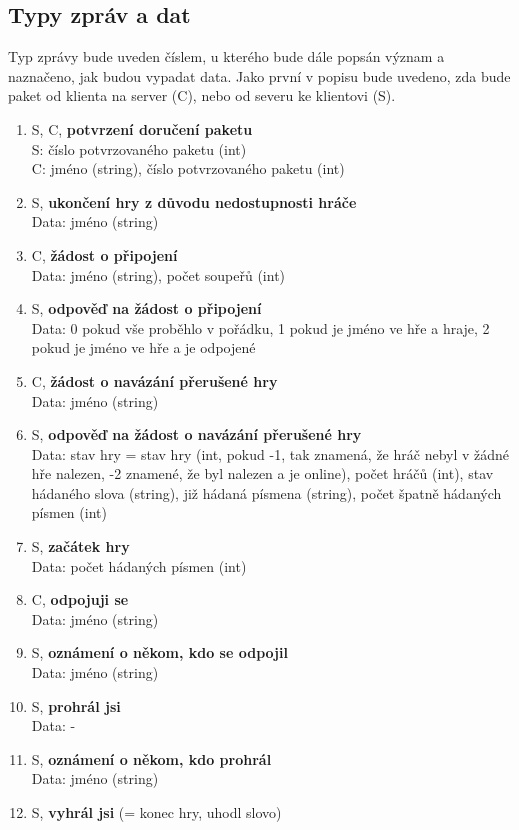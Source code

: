 \documentclass[12pt, a4paper]{article}
\begin{document}
	\subsection{Typy zpráv a dat}
	Typ zprávy bude uveden číslem, u kterého bude dále popsán význam a naznačeno, jak budou vypadat data. Jako první v popisu bude uvedeno, zda bude paket od klienta na server (C), nebo od severu ke klientovi (S).
		\begin{enumerate}
		\item S, C, \textbf{potvrzení doručení paketu}\\
		S: číslo potvrzovaného paketu (int)\\
		C: jméno (string), číslo potvrzovaného paketu (int)
		\item S, \textbf{ukončení hry z důvodu nedostupnosti hráče}\\
		Data: jméno (string)
		\item C, \textbf{žádost o připojení}\\
		Data: jméno (string), počet soupeřů (int)
		\item S, \textbf{odpověď na žádost o připojení}\\
		Data:	0 pokud vše proběhlo v pořádku, 1 pokud je jméno ve hře a hraje, 2 pokud je jméno ve hře a je odpojené
		\item C, \textbf{žádost o navázání přerušené hry}\\
		Data: jméno (string)
		\item S, \textbf{odpověď na žádost o navázání přerušené hry}\\
		Data: stav hry = stav hry (int, pokud -1, tak znamená, že hráč nebyl v žádné hře nalezen, -2 znamené, že byl nalezen a je online), počet hráčů (int), stav hádaného slova (string), již hádaná písmena (string), počet špatně hádaných písmen (int)
		\item S, \textbf{začátek hry}\\
		Data: počet hádaných písmen (int)
		\item C, \textbf{odpojuji se}\\
		Data: jméno (string)
		\item S, \textbf{oznámení o někom, kdo se odpojil}\\
		Data: jméno (string)
		\item S, \textbf{prohrál jsi}\\
		Data: -
		\item S, \textbf{oznámení o někom, kdo prohrál}\\
		Data: jméno (string)
		\item S, \textbf{vyhrál jsi} (= konec hry, uhodl slovo)\\

\end{enumerate}
\end{document}
